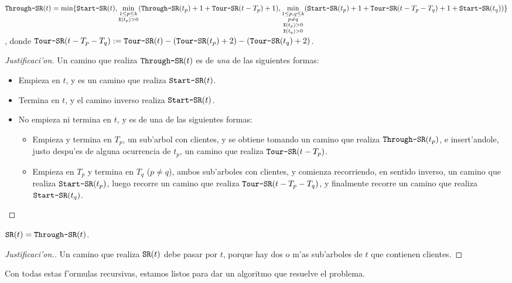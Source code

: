 \begin{claim}
\label{cl:throughsr}
$\texttt{Through-SR}(t) = \min\{\texttt{Start-SR}(t), \min\limits_{\substack{1 \leq p \leq k \\ \texttt{X}(t_p) > 0}}(\texttt{Through-SR}(t_p) + 1 + \texttt{Tour-SR}(t - T_p) + 1), \min\limits_{\substack{1 \leq p, q \leq k \\ p \neq q \\ \texttt{X}(t_p) > 0 \\ \texttt{X}(t_q) > 0}} (\texttt{Start-SR}(t_p) + 1 + \texttt{Tour-SR}(t - T_p - T_q) + 1 + \texttt{Start-SR}(t_q))\}$, donde $\texttt{Tour-SR}(t - T_p - T_q) := \texttt{Tour-SR}(t) - (\texttt{Tour-SR}(t_p) + 2) - (\texttt{Tour-SR}(t_q) + 2)$.

\begin{proof}[Justificaci'on]
Un camino que realiza $\texttt{Through-SR}(t)$ es de \emph{una} de las siguientes formas:
\begin{itemize}
\item Empieza en $t$, y es un camino que realiza $\texttt{Start-SR}(t)$.
\item Termina en $t$, y el camino inverso realiza $\texttt{Start-SR}(t)$.
\item No empieza ni termina en $t$, y es de una de las siguientes formas:
\begin{itemize}
\item Empieza y termina en $T_p$, un sub'arbol con clientes, y se obtiene tomando un camino que realiza $\texttt{Through-SR}(t_p)$, e insert'andole, justo despu'es de alguna ocurrencia de $t_p$, un camino que realiza $\texttt{Tour-SR}(t - T_p)$.
\item Empieza en $T_p$ y termina en $T_q$ ($p \neq q$), ambos sub'arboles con clientes, y comienza recorriendo, en sentido inverso, un camino que realiza $\texttt{Start-SR}(t_p)$, luego recorre un camino que realiza $\texttt{Tour-SR}(t - T_p - T_q)$, y finalmente recorre un camino que realiza $\texttt{Start-SR}(t_q)$.
\end{itemize}
\end{itemize}
\end{proof}
\end{claim}

\begin{claim}
$\texttt{SR}(t) = \texttt{Through-SR}(t)$.

\begin{proof}[Justificaci'on.]
Un camino que realiza $\texttt{SR}(t)$ debe pasar por $t$, porque hay dos o m'as sub'arboles de $t$ que contienen clientes.
\end{proof}
\end{claim}

Con todas estas f'ormulas recursivas, estamos listos para dar un algoritmo que resuelve el problema.

